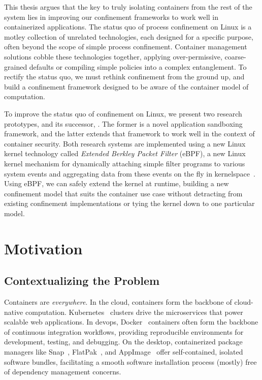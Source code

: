 This thesis argues that the key to truly isolating containers from the rest of the system
lies in improving our confinement frameworks to work well in containerized applications.
The status quo of process confinement on Linux is a motley collection of unrelated
technologies, each designed for a specific purpose, often beyond the scope of simple
process confinement. Container management solutions cobble these technologies together,
applying over-permissive, coarse-grained defaults or compiling simple policies into
a complex entanglement. To rectify the status quo, we must rethink confinement from the
ground up, and build a confinement framework designed to be aware of the container model
of computation.


To improve the status quo of confinement on Linux, we present two research prototypes,
\bpfbox{} and its successor, \bpfcontain{}. The former is a novel application sandboxing
framework, and the latter extends that framework to work well in the context of container
security. Both research systems are implemented using a new Linux kernel technology called
\textit{Extended Berkley Packet Filter} (eBPF), a new Linux kernel mechanism for
dynamically attaching simple filter programs to various system events and aggregating data
from these events on the fly in kernelspace~\cite{gregg2019_bpf,starovoitov2014_ebpf}.
Using eBPF, we can safely extend the kernel at runtime, building a new confinement model
that suits the container use case without detracting from existing confinement
implementations or tying the kernel down to one particular model.


\section{Motivation}%
\label{s:motivation}

\subsection{Contextualizing the Problem}%
\label{ss:contextualizing-the-problem}

Containers are \textit{everywhere}. In the cloud, containers form the backbone of
cloud-native computation. Kubernetes~ clusters drive the microservices that
power scalable web applications. In devops, Docker~ containers often form the
backbone of continuous integration workflows, providing reproducible environments for
development, testing, and debugging. On the desktop, containerized package managers like
Snap~, FlatPak~, and AppImage~ offer self-contained,
isolated software bundles, facilitating a smooth software installation process (mostly)
free of dependency management concerns.

